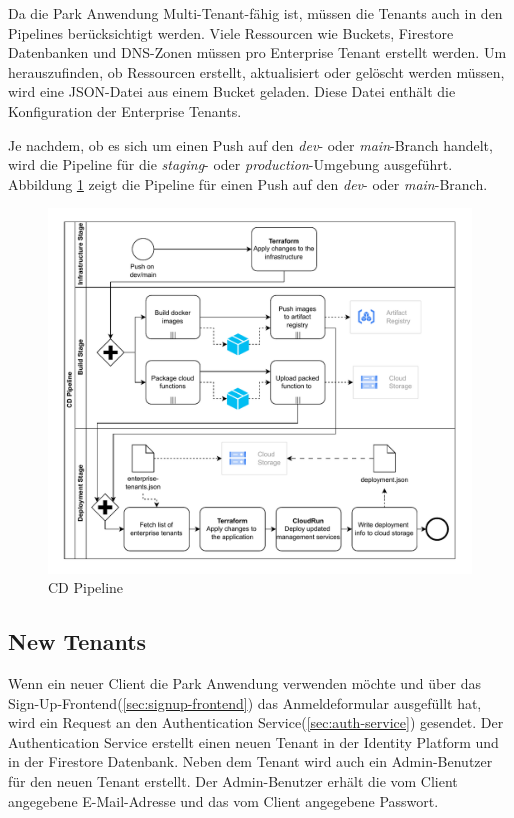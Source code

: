 Da die Park Anwendung Multi-Tenant-fähig ist, müssen die Tenants auch in den Pipelines berücksichtigt werden.
Viele Ressourcen wie Buckets, Firestore Datenbanken und DNS-Zonen müssen pro Enterprise Tenant erstellt werden.
Um herauszufinden, ob Ressourcen erstellt, aktualisiert oder gelöscht werden müssen, wird eine JSON-Datei 
aus einem Bucket geladen. Diese Datei enthält die Konfiguration der Enterprise Tenants.

Je nachdem, ob es sich um einen Push auf den \textit{dev}- oder \textit{main}-Branch handelt, wird die Pipeline
für die \textit{staging}- oder \textit{production}-Umgebung ausgeführt.
Abbildung \ref{fig:cd-pipeline} zeigt die Pipeline für einen Push auf den \textit{dev}- oder \textit{main}-Branch.

\begin{figure}[H]
  \centering
  \includegraphics[width=\textwidth]{resources/cd-pipeline.pdf}
  \caption{CD Pipeline}
  \label{fig:cd-pipeline}
\end{figure}


\subsection{New Tenants}

Wenn ein neuer Client die Park Anwendung verwenden möchte und über das Sign-Up-Frontend(\ref{sec:signup-frontend})
das Anmeldeformular ausgefüllt hat, wird ein Request an den Authentication Service(\ref{sec:auth-service}) gesendet.
Der Authentication Service erstellt einen neuen Tenant in der Identity Platform und in der Firestore Datenbank.
Neben dem Tenant wird auch ein Admin-Benutzer für den neuen Tenant erstellt. Der Admin-Benutzer 
erhält die vom Client angegebene E-Mail-Adresse und das vom Client angegebene Passwort.

